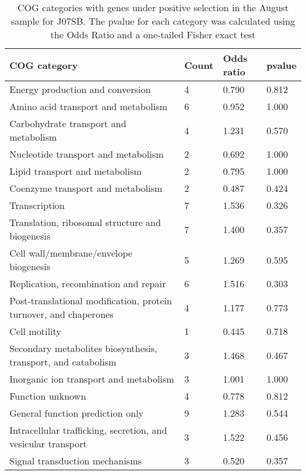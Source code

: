 \begin{table}[hb]
\footnotesize 
	\tabcolsep=0.11cm 
\caption{COG categories with genes under positive selection in the August sample for J07SB. The pvalue for each category was calculated using the Odds Ratio and a one-tailed Fisher exact test \\} 
\begin{tabularx}{\textwidth}{L{6cm}R{2cm}R{2cm}R{2cm}} 
\hline 
\textbf{COG category} & \textbf{Count} & \textbf{Odds ratio} & \textbf{pvalue} \\ 
\hline 
Energy production and conversion & 4 & 0.790 & 0.812 \\ 
Amino acid transport and metabolism & 6 & 0.952 & 1.000 \\ 
Carbohydrate transport and metabolism & 4 & 1.231 & 0.570 \\ 
Nucleotide transport and metabolism & 2 & 0.692 & 1.000 \\ 
Lipid transport and metabolism & 2 & 0.795 & 1.000 \\ 
Coenzyme transport and metabolism & 2 & 0.487 & 0.424 \\ 
Transcription & 7 & 1.536 & 0.326 \\ 
Translation, ribosomal structure and biogenesis & 7 & 1.400 & 0.357 \\ 
Cell wall/membrane/envelope biogenesis & 5 & 1.269 & 0.595 \\ 
Replication, recombination and repair & 6 & 1.516 & 0.303 \\ 
Post-translational modification, protein turnover, and chaperones & 4 & 1.177 & 0.773 \\ 
Cell motility & 1 & 0.445 & 0.718 \\ 
Secondary metabolites biosynthesis, transport, and catabolism & 3 & 1.468 & 0.467 \\ 
Inorganic ion transport and metabolism & 3 & 1.001 & 1.000 \\ 
Function unknown & 4 & 0.778 & 0.812 \\ 
General function prediction only & 9 & 1.283 & 0.544 \\ 
Intracellular trafficking, secretion, and vesicular transport & 3 & 1.522 & 0.456 \\ 
Signal transduction mechanisms & 3 & 0.520 & 0.357 \\ 
\end{tabularx} 
\label{August_COG_Selection_J07SB} 
 \end{table} 

